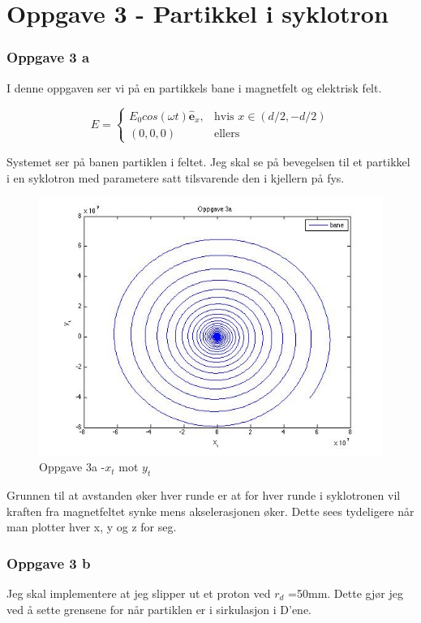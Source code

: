 \documentclass[12pt,a4paper,final,leqno]{report}
\begin{document}
\chapter*{Oppgave 3 - Partikkel i syklotron}
\subsection*{Oppgave 3 a}
I denne oppgaven ser vi på en partikkels bane i magnetfelt og elektrisk felt.

$$E = \begin{cases} E_0cos(\omega t) \hat{\mathbf{e}}_x, & \mbox{hvis } x \in (d/2, -d/2) \\ (0, 0, 0) & \mbox{ellers}\end{cases}$$

Systemet ser på banen partiklen i feltet. Jeg skal se på bevegelsen til et partikkel i en syklotron med parametere satt tilsvarende den i kjellern på fys.
 

\begin{figure}[H]
\caption{Oppgave 3a -$x_t$ mot $y_t$}
\centering
\includegraphics[width=\textwidth]{oppgave3a.jpg}
\end{figure}

Grunnen til at avstanden øker hver runde er at for hver runde i syklotronen vil kraften fra magnetfeltet synke mens akselerasjonen øker. Dette sees tydeligere når man plotter hver x, y og z for seg.
\subsection*{Oppgave 3 b}
Jeg skal implementere at jeg slipper ut et proton ved $r_d$ =50mm. Dette gjør jeg ved å sette grensene for når partiklen er i sirkulasjon i D'ene. 
\end{document}
